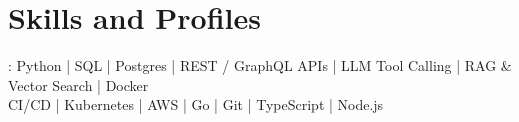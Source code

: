 \documentclass[print]{jack-resume}
\begin{document}
\pagecolor{darkmodeBackground}

%
%



%
%
\begin{minipage}[t][1cm][t]{.03\textwidth}
    \hfill
\end{minipage}






\section{Skills and Profiles}
:
Python \hfill | \hfill
SQL \hfill | \hfill
Postgres \hfill | \hfill
REST / GraphQL APIs \hfill | \hfill
LLM Tool Calling \hfill | \hfill
RAG \& Vector Search \hfill | \hfill
Docker \\
\hspace{1.0cm} CI/CD \hfill | \hfill
Kubernetes \hfill | \hfill
AWS \hfill | \hfill
Go \hfill | \hfill
Git \hfill | \hfill
TypeScript \hfill | \hfill
Node.js \\
\end{document}
